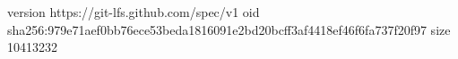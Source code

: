 version https://git-lfs.github.com/spec/v1
oid sha256:979e71aef0bb76ece53beda1816091e2bd20bcff3af4418ef46f6fa737f20f97
size 10413232
